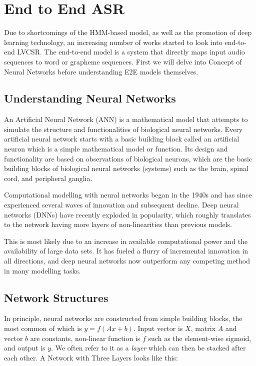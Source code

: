 \section{End to End ASR} 
\label{sec:E2E-asr}

Due to shortcomings of the HMM-based model, as well as the promotion of deep learning technology, an increasing number of works started to look into end-to-end LVCSR. The end-to-end model is a system that directly maps input audio sequences to word or grapheme sequences. First we will delve into Concept of Neural Networks before understanding E2E models themselves.

\subsection{Understanding Neural Networks} 
\label{sub:NeuralNetwork}

An Artificial Neural Network (ANN) is a mathematical model that attempts to simulate the structure and functionalities of biological neural networks. Every artificial neural network starts with a basic building block called an artificial neuron which is a simple mathematical model or function. Its design and functionality are based on observations of biological neurons, which are the basic building blocks of biological neural networks (systems) such as the brain, spinal cord, and peripheral ganglia.

Computational modelling with neural networks began in the 1940s and has since experienced several waves of innovation and subsequent decline. Deep neural networks (DNNs) have recently exploded in popularity, which roughly translates to the network having more layers of non-linearities than previous models. 

This is most likely due to an increase in available computational power and the availability of large data sets. It has fueled a flurry of incremental innovation in all directions, and deep neural networks now outperform any competing method in many modelling tasks.

\subsection{Network Structures}

In principle, neural networks are constructed from simple building blocks, the most common of which is $y=f(Ax+b)$. Input vector is $X$, matrix $A$ and vector $b$ are constants, non-linear function is $f$ such as the element-wise sigmoid, and output is $y$. We often refer to it as a \textit{layer} which can then be stacked after each other. A Network with Three Layers looks like this:

